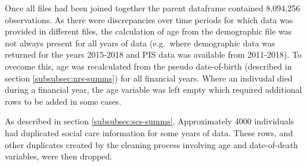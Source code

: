 \documentclass[]{article}
\begin{document}
\begin{table}[h]
\caption{Joining files together and cleaning process}
\label{tab:joining}
\end{table}

Once all files had been joined together the parent dataframe contained
8,094,256 observations. As there were discrepancies over time periods
for which data was provided in different files, the calculation of age
from the demographic file was not always present for all years of data
(e.g.~where demographic data was returned for the years 2015-2018 and
PIS data was available from 2011-2018). To ovecome this, age was
recalculated from the pseudo date-of-birth (described in section
\ref{subsubsec:nrs-summs}) for all financial years. Where an indivudal
died during a financial year, the age variable was left empty which
required additional rows to be added in some cases.

As described in section \ref{subsubsec:scs-summs}, Approximately 4000
individuals had duplicated social care information for some years of
data. These rows, and other duplicates created by the cleaning process
involving age and date-of-death variables, were then dropped.
\end{document}
